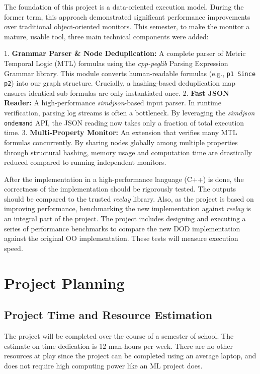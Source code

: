\documentclass[a4paper,12pt]{report}
\begin{document}
The foundation of this project is a data-oriented execution model. During the former term, this approach demonstrated significant performance improvements over traditional object-oriented monitors. This semester, to make the monitor a mature, usable tool, three main technical components were added:

1. \textbf{Grammar Parser \& Node Deduplication:} A complete parser of Metric Temporal Logic (MTL) formulas using the \textit{cpp-peglib} Parsing Expression Grammar library. This module converts human-readable formulas (e.g., \texttt{p1 Since p2}) into our graph structure. Crucially, a hashing-based deduplication map ensures identical sub-formulas are only instantiated once. 
2. \textbf{Fast JSON Reader:} A high-performance \textit{simdjson}-based input parser. In runtime verification, parsing log streams is often a bottleneck. By leveraging the \textit{simdjson} \texttt{ondemand} API, the JSON reading now takes only a fraction of total execution time.
3. \textbf{Multi-Property Monitor:} An extension that verifies many MTL formulas concurrently. By sharing nodes globally among multiple properties through structural hashing, memory usage and computation time are drastically reduced compared to running independent monitors.

After the implementation in a high-performance language (C++) is done, the correctness of the implementation should be rigorously tested. The outputs should be compared to the trusted \textit{reelay} library. Also, as the project is based on improving performance, benchmarking the new implementation against \textit{reelay} is an integral part of the project. The project includes designing and executing a series of performance benchmarks to compare the new DOD implementation against the original OO implementation. These tests will measure execution speed.

\section{Project Planning}
\subsection{Project Time and Resource Estimation}
The project will be completed over the course of a semester of school. The estimate on time dedication is 12 man-hours per week. There are no other resources at play since the project can be completed using an average laptop, and does not require high computing power like an ML project does.
\end{document}
